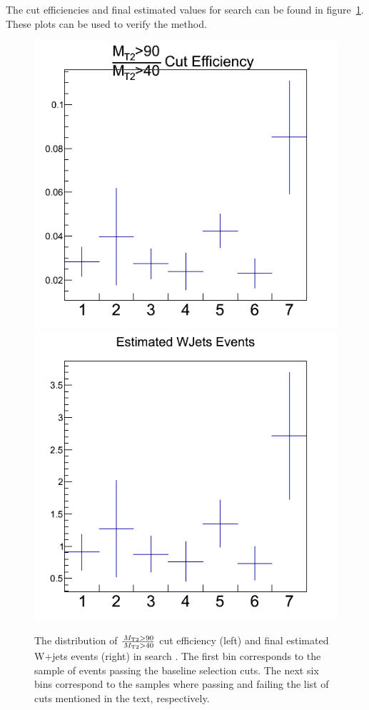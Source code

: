  The cut efficiencies and final estimated values for 
search \binone can be found in figure~\ref{fig:wjets_1}. These plots can be used to verify the method. 
\begin{figure}[iHhtb]
\centering
\includegraphics[angle=0,scale=0.35]{TauTauFigs/eff_bin1.png}
\includegraphics[angle=0,scale=0.35]{TauTauFigs/est_bin1.png} \\
\caption{The distribution of $\frac{\,{M_{\rm T2}}>90}{\,{M_{\rm T2}}>40}$ cut 
efficiency (left) and final estimated W+jets events (right) in search \binone.
 The first bin corresponds to the sample of events passing the baseline selection cuts. 
The next six bins correspond to the samples where passing and failing the 
list of cuts mentioned in the text, respectively.}
\label{fig:wjets_1}
\end{figure}

